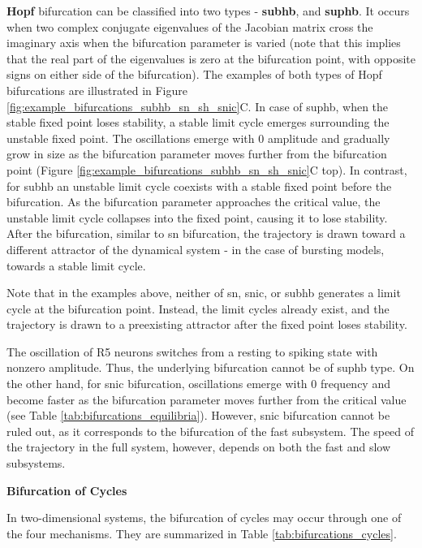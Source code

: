 \documentclass[../main.tex]{subfiles}
\begin{document}
\textbf{Hopf} bifurcation can be classified into two types - \textbf{\gls{subhb}}, and \textbf{\gls{suphb}}. It occurs when two complex conjugate eigenvalues of the Jacobian matrix cross the imaginary axis when the bifurcation parameter is varied (note that this implies that the real part of the eigenvalues is zero at the bifurcation point, with opposite signs on either side of the bifurcation). The examples of both types of Hopf bifurcations are illustrated in Figure \ref{fig:example_bifurcations_subhb_sn_sh_snic}C. In case of \gls{suphb}, when the stable fixed point loses stability, a stable limit cycle emerges surrounding the unstable fixed point. The oscillations emerge with $0$ amplitude and gradually grow in size as the bifurcation parameter moves further from the bifurcation point (Figure \ref{fig:example_bifurcations_subhb_sn_sh_snic}C top). In contrast, for \gls{subhb} an unstable limit cycle coexists with a stable fixed point before the bifurcation. As the bifurcation parameter approaches the critical value, the unstable limit cycle collapses into the fixed point, causing it to lose stability. After the bifurcation, similar to \gls{sn} bifurcation, the trajectory is drawn toward a different attractor of the dynamical system - in the case of bursting models, towards a stable limit cycle.

Note that in the examples above, neither of \gls{sn}, \gls{snic}, or \gls{subhb} generates a limit cycle at the bifurcation point. Instead, the limit cycles already exist, and the trajectory is drawn to a preexisting attractor after the fixed point loses stability.

The oscillation of R5 neurons switches from a resting to spiking state with nonzero amplitude. Thus, the underlying bifurcation cannot be of \gls{suphb} type. On the other hand, for \gls{snic} bifurcation, oscillations emerge with $0$ frequency and become faster as the bifurcation parameter moves further from the critical value (see Table \ref{tab:bifurcations_equilibria}). However, \gls{snic} bifurcation cannot be ruled out, as it corresponds to the bifurcation of the fast subsystem. The speed of the trajectory in the full system, however, depends on both the fast and slow subsystems.


\vspace*{0.3cm}
\noindent\textbf{Bifurcation of Cycles}

In two-dimensional systems, the bifurcation of cycles may occur through one of the four mechanisms. They are summarized in Table \ref{tab:bifurcations_cycles}.
\end{document}

